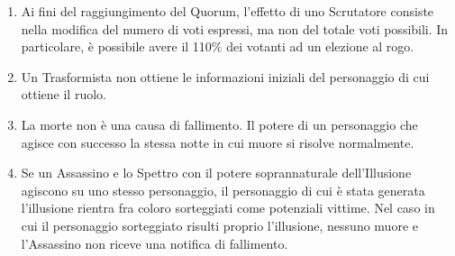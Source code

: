 \documentclass[a4paper,10pt]{article}
\begin{document}
\begin{enumerate}
 \item Ai fini del raggiungimento del Quorum, l'effetto di uno Scrutatore consiste nella modifica del numero di voti espressi, ma non del totale voti possibili. In particolare, è possibile avere il 110\% dei votanti ad un elezione al rogo.
 
 \item Un Trasformista non ottiene le informazioni iniziali del personaggio di cui ottiene il ruolo.
 
 \item La morte non è una causa di fallimento. Il potere di un personaggio che agisce con successo la stessa notte in cui muore si risolve normalmente.
 
 \item Se un Assassino e lo Spettro con il potere soprannaturale dell'Illusione agiscono su uno stesso personaggio, il personaggio di cui è stata generata l'illusione rientra fra coloro sorteggiati come potenziali vittime. Nel caso in cui il personaggio sorteggiato risulti proprio l'illusione, nessuno muore e l'Assassino non riceve una notifica di fallimento.
\end{enumerate}



\printindex
\end{document}
